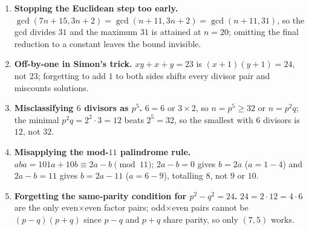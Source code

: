\documentclass[11pt,a4paper]{article}
\begin{document}
\begin{enumerate}[leftmargin=2em, itemsep=4pt]
  \item \textbf{Stopping the Euclidean step too early.}
        $\gcd(7n+15,3n+2)=\gcd(n+11,3n+2)=\gcd(n+11,31)$, so the gcd divides $31$ and the maximum $31$ is attained at $n=20$; omitting the final reduction to a constant leaves the bound invisible. 
  \item \textbf{Off-by-one in Simon's trick.}
        $xy+x+y=23$ is $(x+1)(y+1)=24$, not $23$; forgetting to add $1$ to both sides shifts every divisor pair and miscounts solutions. 
  \item \textbf{Misclassifying $6$ divisors as $p^{5}$.}
        $6=6$ or $3\times2$, so $n=p^{5}\ge32$ or $n=p^{2}q$; the minimal $p^{2}q=2^{2}\cdot3=12$ beats $2^{5}=32$, so the smallest with $6$ divisors is $12$, not $32$. 
  \item \textbf{Misapplying the mod-$11$ palindrome rule.}
        $aba=101a+10b\equiv2a-b\pmod{11}$; $2a-b=0$ gives $b=2a$ ($a=1\!-\!4$) and $2a-b=11$ gives $b=2a-11$ ($a=6\!-\!9$), totalling $8$, not $9$ or $10$. 
  \item \textbf{Forgetting the same-parity condition for $p^{2}-q^{2}=24$.}
        $24=2\cdot12=4\cdot6$ are the only even$\times$even factor pairs; odd$\times$even pairs cannot be $(p-q)(p+q)$ since $p-q$ and $p+q$ share parity, so only $(7,5)$ works. 
\end{enumerate}

\end{document}
